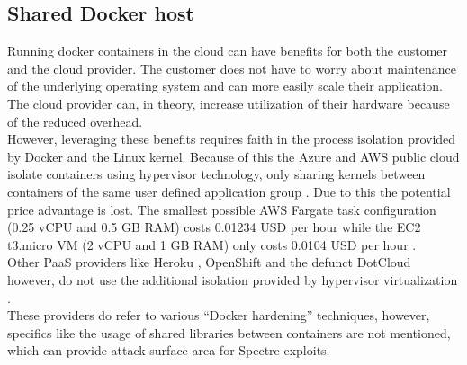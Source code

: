 \documentclass[conference,compsoc,final,a4paper]{IEEEtran}
\begin{document}
\subsection{Shared Docker host}
Running docker containers in the cloud can have benefits for both the customer and the cloud provider. The customer does not have to worry about maintenance
of the underlying operating system and can more easily scale their application. The cloud provider can, in theory, increase utilization of their hardware
because of the reduced overhead. \\
However, leveraging these benefits requires faith in the process isolation provided by Docker and the Linux kernel. Because of this the Azure and \ac{AWS} public
cloud isolate containers using hypervisor technology, only sharing kernels between containers of the same user defined application group
\cite{fargateIsolation, azureIsolation}. Due to this the
potential price advantage is lost. The smallest possible \ac{AWS} Fargate task configuration (0.25 vCPU and 0.5 GB RAM) costs 0.01234 USD per hour \cite{fargatePricing}
while the EC2 t3.micro VM (2 vCPU and 1 GB RAM) only costs 0.0104 USD per hour \cite{ec2Pricing}. \\
Other \ac{PaaS} providers like
Heroku \cite{herokuIsolation}, OpenShift \cite{openshiftIsolation} and the defunct DotCloud however, do not use the additional isolation provided
by hypervisor virtualization \cite{zhang2014cross}. \\
These providers do refer to various \enquote{Docker hardening} techniques, however, specifics like the usage of
shared libraries between containers are not mentioned, which can provide attack surface area for Spectre exploits. \cite{retpolineTurner}
\end{document}
